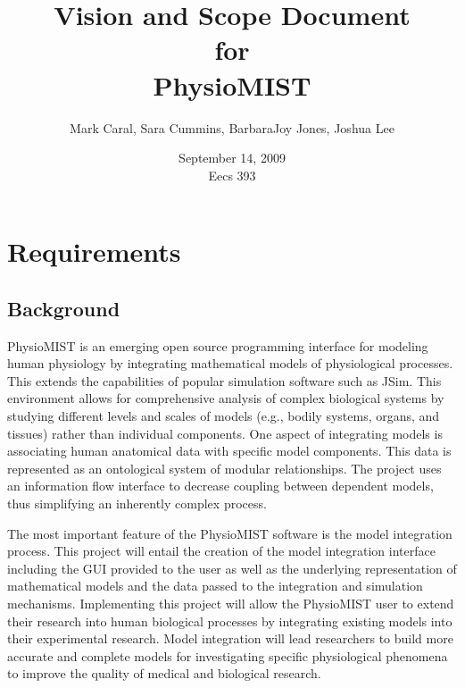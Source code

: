 \documentclass{article}
\title{Vision and Scope Document\\
\bigskip
{\large for}\\
\bigskip
PhysioMIST}
\author{Mark Caral, Sara Cummins, BarbaraJoy Jones, Joshua Lee}
\date{September 14, 2009\\{\sc Eecs} 393}
\begin{document}
\begin{titlepage}
\maketitle
\end{titlepage}

\tableofcontents
\newpage

\section{Requirements}
\subsection{Background}
PhysioMIST is an emerging open source programming interface for modeling human physiology by integrating mathematical models of physiological processes.
This extends the capabilities of popular simulation software such as JSim.
This environment allows for comprehensive analysis of complex biological systems by studying different levels and scales of models (e.g., bodily systems, organs, and tissues) rather than individual components.
One aspect of integrating models is associating human anatomical data with specific model components. This data is represented as an ontological system of modular relationships.
The project uses an information flow interface to decrease coupling between dependent models, thus simplifying an inherently complex process.

The most important feature of the PhysioMIST software is the model integration process.
This project will entail the creation of the model integration interface including the GUI provided to the user as well as the underlying representation of mathematical models and the data passed to the integration and simulation mechanisms.
Implementing this project will allow the PhysioMIST user to extend their research into human biological processes by integrating existing models into their experimental research.
Model integration will lead researchers to build more accurate and complete models for investigating specific physiological phenomena to improve the quality of medical and biological research.
\end{document}

